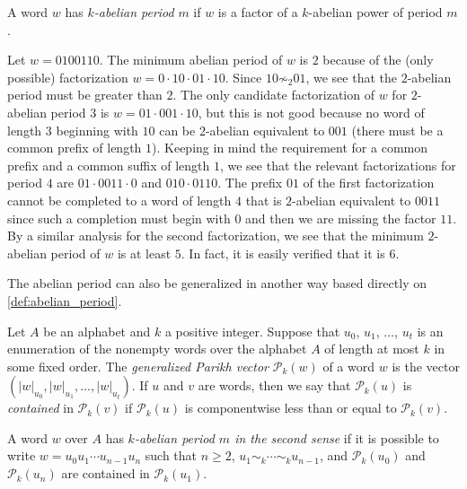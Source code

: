 \documentclass[a4paper,fleqn]{article}
\providecommand{\abs}[1]{\lvert#1\rvert}
\newcommand{\Parikh}[2][]{\mathcal{P}_{#1}(#2)}
\begin{document}
  \begin{definition}
    A word $w$ has \emph{$k$-abelian period} $m$ if $w$ is a factor of a $k$-abelian power of period $m$.
  \end{definition}

  \begin{example}\label{ex:k-ab_example}
    Let $w = 0100110$. The minimum abelian period of $w$ is $2$ because of the (only possible) factorization
    $w = 0 \cdot 10 \cdot 01 \cdot 10$. Since $10 \not\sim_2 01$, we see that the $2$-abelian period must be greater
    than $2$. The only candidate factorization of $w$ for $2$-abelian period $3$ is $w = 01 \cdot 001 \cdot 10$, but
    this is not good because no word of length $3$ beginning with $10$ can be $2$-abelian equivalent to $001$ (there
    must be a common prefix of length $1$). Keeping in mind the requirement for a common prefix and a common suffix of
    length $1$, we see that the relevant factorizations for period $4$ are $01 \cdot 0011 \cdot 0$ and
    $010 \cdot 0110$. The prefix $01$ of the first factorization cannot be completed to a word of length $4$ that is
    $2$-abelian equivalent to $0011$ since such a completion must begin with $0$ and then we are missing the factor
    $11$. By a similar analysis for the second factorization, we see that the minimum $2$-abelian period of $w$ is at
    least $5$. In fact, it is easily verified that it is $6$.
  \end{example}

  The abelian period can also be generalized in another way based directly on \autoref{def:abelian_period}.

  \begin{definition}
    Let $A$ be an alphabet and $k$ a positive integer. Suppose that $u_0$, $u_1$, $\ldots$, $u_t$ is an enumeration of
    the nonempty words over the alphabet $A$ of length at most $k$ in some fixed order. The \emph{generalized Parikh
    vector} $\Parikh[k]{w}$ of a word $w$ is the vector $(\abs{w}_{u_0}, \abs{w}_{u_1}, \ldots, \abs{w}_{u_t})$. If
    $u$ and $v$ are words, then we say that $\Parikh[k]{u}$ is \emph{contained} in $\Parikh[k]{v}$ if $\Parikh[k]{u}$
    is componentwise less than or equal to $\Parikh[k]{v}$.
  \end{definition}

  \begin{definition}
    A word $w$ over $A$ has \emph{$k$-abelian period $m$ in the second sense} if it is possible to write
    $w = u_0 u_1 \dotsm u_{n-1} u_n$ such that $n \geq 2$, $u_1 \sim_k \dotsm \sim_k u_{n-1}$, and $\Parikh[k]{u_0}$
    and $\Parikh[k]{u_n}$ are contained in $\Parikh[k]{u_1}$.
  \end{definition}
\end{document}
